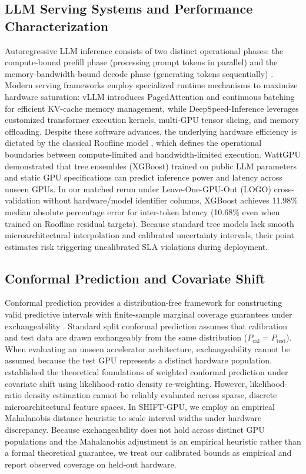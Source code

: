 \documentclass[preprint,12pt]{elsarticle}
\begin{document}
\subsection{LLM Serving Systems and Performance Characterization}
Autoregressive LLM inference consists of two distinct operational phases: the compute-bound prefill phase (processing prompt tokens in parallel) and the memory-bandwidth-bound decode phase (generating tokens sequentially) \citep{kwon2023vllm}. Modern serving frameworks employ specialized runtime mechanisms to maximize hardware saturation: vLLM \citep{kwon2023vllm} introduces PagedAttention and continuous batching for efficient KV-cache memory management, while DeepSpeed-Inference \citep{aminabadi2022deepspeed} leverages customized transformer execution kernels, multi-GPU tensor slicing, and memory offloading. Despite these software advances, the underlying hardware efficiency is dictated by the classical Roofline model \citep{williams2009roofline}, which defines the operational boundaries between compute-limited and bandwidth-limited execution. WattGPU \citep{fadel2026wattgpu} demonstrated that tree ensembles (XGBoost) trained on public LLM parameters and static GPU specifications can predict inference power and latency across unseen GPUs. In our matched rerun under Leave-One-GPU-Out (LOGO) cross-validation without hardware/model identifier columns, XGBoost achieves 11.98\% median absolute percentage error for inter-token latency (10.68\% even when trained on Roofline residual targets). Because standard tree models lack smooth microarchitectural interpolation and calibrated uncertainty intervals, their point estimates risk triggering uncalibrated SLA violations during deployment.

\subsection{Conformal Prediction and Covariate Shift}
Conformal prediction provides a distribution-free framework for constructing valid predictive intervals with finite-sample marginal coverage guarantees under exchangeability \citep{angelopoulos2023conformal}. Standard split conformal prediction assumes that calibration and test data are drawn exchangeably from the same distribution ($P_{\text{cal}} = P_{\text{test}}$). When evaluating an unseen accelerator architecture, exchangeability cannot be assumed because the test GPU represents a distinct hardware population. \citet{tibshirani2019conformal_covariate} established the theoretical foundations of weighted conformal prediction under covariate shift using likelihood-ratio density re-weighting. However, likelihood-ratio density estimation cannot be reliably evaluated across sparse, discrete microarchitectural feature spaces. In SHIFT-GPU, we employ an empirical Mahalanobis distance heuristic to scale interval widths under hardware discrepancy. Because exchangeability does not hold across distinct GPU populations and the Mahalanobis adjustment is an empirical heuristic rather than a formal theoretical guarantee, we treat our calibrated bounds as empirical and report observed coverage on held-out hardware.
\end{document}
